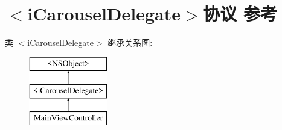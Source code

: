 \hypertarget{protocoli_carousel_delegate-p}{\section{$<$i\-Carousel\-Delegate$>$协议 参考}
\label{protocoli_carousel_delegate-p}
}
类 $<$i\-Carousel\-Delegate$>$ 继承关系图\-:\begin{figure}[H]
\begin{center}
\leavevmode
\includegraphics[height=3.000000cm]{protocoli_carousel_delegate-p}
\end{center}
\end{figure}
